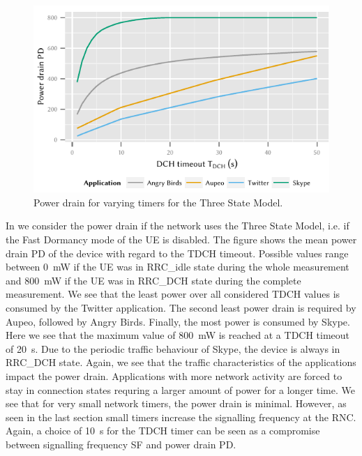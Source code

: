 \begin{figure}
	\centering
	\includegraphics{network/network_traces/numerical_results/figures/3_state_tdch_vs_power_drain}
	\caption{Power drain  for varying  timers for the Three State Model.}\label{fig:network:network_traces:numerical_results:three_states:power_drain}
\end{figure}
In  we consider the power drain if the network uses the Three State Model, i.e. if the Fast Dormancy mode of the \gls{UE} is disabled.
The figure shows the mean power drain \gls{PD} of the device with regard to the \gls{TDCH} timeout.
Possible values range between \SI{0}{\milli\watt} if the \gls{UE} was in \gls{RRC_idle} state during the whole measurement and \SI{800}{\milli\watt} if the \gls{UE} was in \gls{RRC_DCH} state during the complete measurement.
We see that the least power over all considered \gls{TDCH} values is consumed by the Twitter application.
The second least power drain is required by Aupeo, followed by Angry Birds.
Finally, the most power is consumed by Skype.
Here we see that the maximum value of \SI{800}{\milli\watt} is reached at a \gls{TDCH} timeout of \SI{20}{\second}.
Due to the periodic traffic behaviour of Skype, the device is always in \gls{RRC_DCH} state.
Again, we see that the traffic characteristics of the applications impact the power drain.
Applications with more network activity are forced to stay in connection states requring a larger amount of power for a longer time.
We see that for very small network timers, the power drain is minimal.
However, as seen in the last section small timers increase the signalling frequency at the \gls{RNC}.
Again, a choice of \SI{10}{\second} for the \gls{TDCH} timer can be seen as a compromise between signalling frequency \gls{SF} and power drain \gls{PD}.

